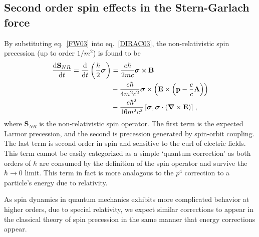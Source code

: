 \subsection{Second order spin effects in the Stern-Garlach force}
\label{sec:spinspin}
By substituting eq.~\eqref{FW03} into eq.~\eqref{DIRAC03}, the non-relativistic spin precession (up to order $1/m^{2}$) is found to be
\begin{alignat}{1}
  \notag\frac{\mathrm{d}\mathbf{S}_{NR}}{\mathrm{d}t}=\frac{\mathrm{d}}{\mathrm{d}t}\left(\frac{\hbar}{2}\boldsymbol{\sigma}\right)&=\frac{e\hbar}{2mc}\boldsymbol{\sigma}\times\mathbf{B}\\
  \notag&-\frac{e\hbar}{4m^{2}c^{2}}\boldsymbol{\sigma}\times\left(\mathbf{E}\times\left(\mathbf{p}-\frac{e}{c}\mathbf{A}\right)\right)\\
  \label{SPIN01}&-\frac{e\hbar^{2}}{16m^{2}c^{2}}\left[\boldsymbol{\sigma},\boldsymbol{\sigma}\cdot\left(\boldsymbol{\nabla}\times\mathbf{E}\right)\right]\,,
\end{alignat}
where $\mathbf{S}_{NR}$ is the non-relativistic spin operator. The first term is the expected Larmor precession, and the second is precession generated by spin-orbit coupling. The last term is second order in spin and sensitive to the curl of electric fields. This term cannot be easily categorized as a simple `quantum correction' as both orders of $\hbar$ are consumed by the definition of the spin operator and survive the $\hbar\rightarrow 0$ limit. This term in fact is more analogous to the $p^{4}$ correction to a particle's energy due to relativity.

As spin dynamics in quantum mechanics exhibits more complicated behavior at higher orders, due to special relativity, we expect similar corrections to appear in the classical theory of spin precession in the same manner that energy corrections appear.











